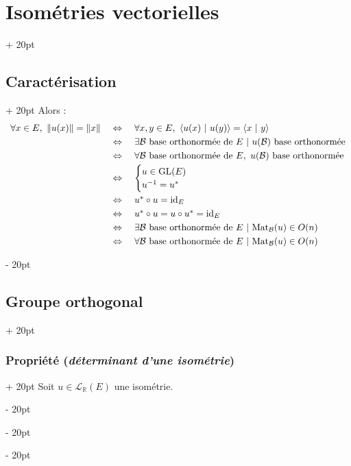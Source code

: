 \documentclass[a4paper, 12pt, twoside]{article}
\newcommand{\R}{\mathbb{R}} %
\newcommand{\lrangle}[1]{\left\langle #1 \right\rangle}
\newcommand{\norm}[1]{\left\lVert #1 \right\rVert}
\newcommand{\ssi}{\ \Leftrightarrow \ }
\newcommand{\ps}[2]{\lrangle{#1\ |\ #2}}
\newcommand{\ind}[1][20pt]{\advance\leftskip + #1}
\newcommand{\deind}[1][20pt]{\advance\leftskip - #1}
\newenvironment{indt}[2][20pt]{#2 \par \ind[#1]}{\par \deind} %
\begin{document}
\begin{indt}{\section{Isométries vectorielles}}
\begin{indt}{\subsection{Caractérisation}}
            Alors :
            \[
                \begin{array}{rcl}
                    \forall x \in E,\ \norm{u(x)} = \norm x
                    &\ssi&
                    \forall x, y \in E,\ \ps{u(x)}{u(y)} = \ps x y
                    \vspace{3pt}
                    \\
                    &\ssi& \exists \mathcal B\ \text{base orthonormée de}\ E\ |\ u(\mathcal B)\ \text{base orthonormée}
                    \vspace{3pt}
                    \\
                    &\ssi& \forall \mathcal B\ \text{base orthonormée de}\ E,\ u(\mathcal B)\ \text{base orthonormée}
                    \vspace{3pt}
                    \\
                    &\ssi&
                    \begin{cases}
                        u \in \mathrm{GL}(E)
                        \\
                        u^{-1} = u^*
                    \end{cases}
                    \vspace{3pt}
                    \\
                    &\ssi&
                    u^* \circ u = \mathrm{id}_E
                    \vspace{3pt}
                    \\
                    &\ssi& u^* \circ u = u \circ u^* = \mathrm{id}_E
                    \vspace{3pt}
                    \\
                    &\ssi& \exists \mathcal B\ \text{base orthonormée de}\ E\ |\ \mathrm{Mat}_{\mathcal B}(u) \in O(n)
                    \vspace{3pt}
                    \\
                    &\ssi& \forall \mathcal B\ \text{base orthonormée de}\ E\ |\ \mathrm{Mat}_{\mathcal B}(u) \in O(n)
                \end{array}
            \]
        \end{indt}

        \vspace{12pt}
        
        \begin{indt}{\subsection{Groupe orthogonal}}
            \begin{indt}{\subsubsection{Propriété (\textit{déterminant d'une isométrie})}}
                Soit $u \in \mathcal L_\R(E)$ une isométrie.


\end{indt}
\end{indt}
\end{indt}
\end{document}
